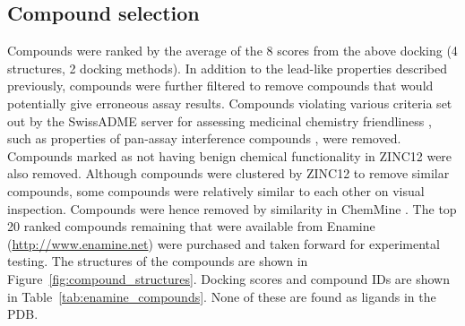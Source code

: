 \subsection{Compound selection}

Compounds were ranked by the average of the 8 scores from the above docking (4 structures, 2 docking methods).
In addition to the lead-like properties described previously, compounds were further filtered to remove compounds that would potentially give erroneous assay results.
Compounds violating various criteria set out by the SwissADME server for assessing medicinal chemistry friendliness \cite{Daina2017}, such as properties of pan-assay interference compounds \cite{Baell2014}, were removed.
Compounds marked as not having benign chemical functionality in ZINC12 were also removed.
Although compounds were clustered by ZINC12 to remove similar compounds, some compounds were relatively similar to each other on visual inspection.
Compounds were hence removed by similarity in ChemMine \cite{Backman2011}.
The top 20 ranked compounds remaining that were available from Enamine (\url{http://www.enamine.net}) were purchased and taken forward for experimental testing.
The structures of the compounds are shown in Figure~\ref{fig:compound_structures}.
Docking scores and compound IDs are shown in Table~\ref{tab:enamine_compounds}.
None of these are found as ligands in the PDB.


